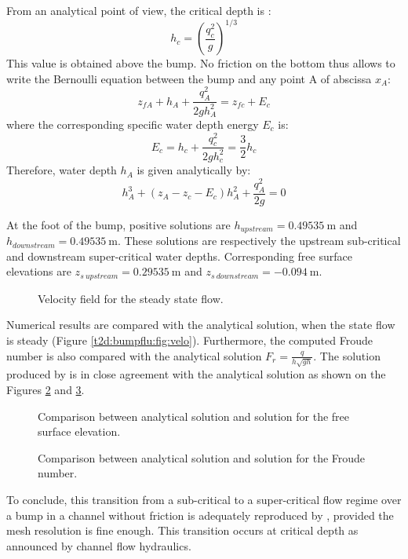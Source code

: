 \bigskip
From an analytical point of view, the critical depth is :
\begin{equation*}
h_c=\left(\frac{q_{c}^2}{g}\right)^{1/3}
\end{equation*}
This value is obtained above the bump.
No friction on the bottom thus allows to write the Bernoulli 
equation between the bump and any point A of abscissa $x_A$:
\begin{equation*}
  z_{fA}+h_{A}+ \frac{q_{A}^{2}}{2gh_{A}^{2}}=z_{fc}+E_{c}
\end{equation*}
where the corresponding specific water depth energy $E_c$ is:
\begin{equation*}
E_c=h_c+\frac{q_{c}^2}{2gh_c^2}=\frac{3}{2}h_c
\end{equation*}
Therefore, water depth $h_A$ is given analytically by:	
\begin{equation}
h_A^3+(z_A-z_c-E_c)h_A^2+\frac{q_{A}^2}{2g}=0
\label{t2d:bumpcri:eq:ha}
\end{equation} 

\bigskip
At the foot of the bump, positive solutions are $h_{upstream}=0.49535~\text{m}$ 
and $h_{downstream}=0.49535~\text{m}$. These solutions are respectively 
the upstream sub-critical and downstream super-critical water depths. 
Corresponding free surface elevations are $ z_{s~upstream} = 0.29535~\text{m}$ 
and $z_{s~downstream} = - 0.094~\text{m}$.

\begin{figure}[!htbp]
 \centering
 \caption{Velocity field for the steady state flow.}
 \label{t2d:bumpcri:fig:velo}
\end{figure}

\bigskip
Numerical results are compared with the analytical solution, when the 
state flow is steady (Figure \ref{t2d:bumpflu:fig:velo}). 
Furthermore, the computed Froude number is also compared with the 
analytical solution $\displaystyle F_{r}=\frac{q}{h\sqrt{gh}}$.
The solution produced by  is in close agreement with 
the analytical solution as shown on the Figures \ref{t2d:bumpcri:fig:h} 
and \ref{t2d:bumpcri:fig:fr}. 

\begin{figure}[!htbp]
 \centering
 \caption{Comparison between analytical solution and  
 solution for the free surface elevation.}
 \label{t2d:bumpcri:fig:h}
\end{figure}
\begin{figure}[!htbp]
 \centering
 \caption{Comparison between analytical solution and  
 solution for the Froude number.}
 \label{t2d:bumpcri:fig:fr}
\end{figure}

\bigskip
To conclude, this transition from a sub-critical to a super-critical flow 
regime over a bump in a channel without friction is adequately reproduced by 
, provided the mesh resolution is fine enough. This transition 
occurs at critical depth as announced by channel flow hydraulics.
